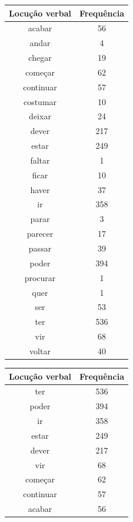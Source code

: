 \documentclass[output=paper,colorlinks,citecolor=brown]{langscibook}
\begin{document}
		\begin{table}[]
			\parbox{.45\linewidth}{
				\centering
				\begin{tabular}{|c|c|}
					\hline
					\textbf{Locução verbal} & \textbf{Frequência} \\\hline
					acabar & 56\\\hline
					andar & 4\\\hline
					chegar & 19\\\hline
					começar & 62\\\hline
					continuar & 57\\\hline
					costumar & 10\\\hline
					deixar & 24\\\hline
					dever & 217\\\hline
					estar & 249\\\hline
					faltar & 1\\\hline
					ficar & 10\\\hline
					haver & 37\\\hline
					ir & 358\\\hline
					parar & 3\\\hline
					parecer & 17\\\hline
					passar & 39\\\hline
					poder & 394\\\hline
					procurar & 1\\\hline
					quer & 1\\\hline
					ser & 53\\\hline
					ter & 536\\\hline
					vir & 68\\\hline
					voltar & 40\\\hline
				\end{tabular}
			}
			\hfill
			\parbox{.45\linewidth}{
				\centering
				\begin{tabular}{|c|c|}
					\hline
					\textbf{Locução verbal} & \textbf{Frequência} \\\hline
					ter & 536\\\hline
					poder & 394\\\hline
					ir & 358\\\hline
					estar & 249\\\hline
					dever & 217\\\hline
					vir & 68\\\hline
					começar & 62\\\hline
					continuar & 57\\\hline
					acabar & 56\\\hline

\end{tabular}}
\end{table}
\end{document}
